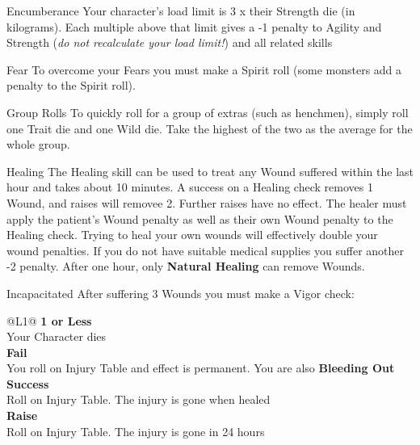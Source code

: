 \begin{genericsection}{Encumberance}
Your character's load limit is 3 x their Strength die (in kilograms). Each multiple above that limit gives a -1 penalty to Agility and Strength (\textit{do not recalculate your load limit!}) and all related skills
\end{genericsection}

\begin{genericsection}{Fear}
To overcome your Fears you must make a Spirit roll (some monsters add a penalty to the Spirit roll).
\end{genericsection}

\begin{genericsection}{Group Rolls}
To quickly roll for a group of extras (such as henchmen), simply roll one Trait die and one Wild die. Take the highest of the two as the average for the whole group.
\end{genericsection}

\begin{genericsection}{Healing}
The Healing skill can be used to treat any Wound suffered within the last hour and takes about 10 minutes. A success on a Healing check removes 1 Wound, and raises will removee 2. Further raises have no effect. The healer must apply the patient's Wound penalty as well as their own Wound penalty to the Healing check. Trying to heal your own wounds will effectively double your wound penalties. If you do not have suitable medical supplies you suffer another -2 penalty. After one hour, only \textbf{Natural Healing} can remove Wounds.
\end{genericsection}

\begin{genericsection}{Incapacitated}
\label{sec:rules-concepts-incapacitated}
After suffering 3 Wounds you must make a Vigor check:
\begin{redtable}{\linewidth}{@{}L{1}@{}}
  \textbf{1 or Less}\\
  Your Character dies\\
  \textbf{Fail}\\
  You roll on Injury Table and effect is permanent. You are also \textbf{Bleeding Out}\\
  \textbf{Success}\\
  Roll on Injury Table. The injury is gone when healed\\
  \textbf{Raise}\\
  Roll on Injury Table. The injury is gone in 24 hours\\
\end{redtable}
\end{genericsection}


